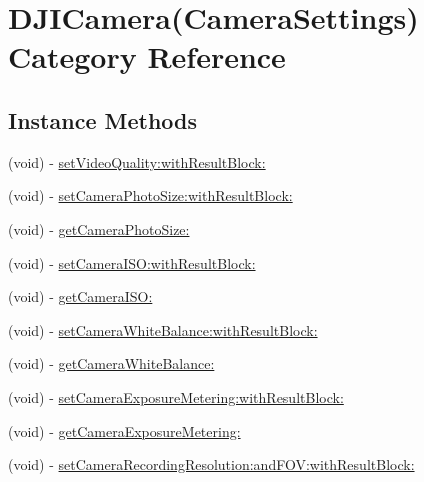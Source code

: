 \hypertarget{category_d_j_i_camera_07_camera_settings_08}{\section{D\+J\+I\+Camera(Camera\+Settings) Category Reference}
\label{category_d_j_i_camera_07_camera_settings_08}
}
\subsection*{Instance Methods}
\begin{DoxyCompactItemize}
\item 
(void) -\/ \hyperlink{category_d_j_i_camera_07_camera_settings_08_a056998f58df4c307417929683cd56066}{set\+Video\+Quality\+:with\+Result\+Block\+:}
\item 
(void) -\/ \hyperlink{category_d_j_i_camera_07_camera_settings_08_a0b0183eed1dbf991ce49942f32e78a4b}{set\+Camera\+Photo\+Size\+:with\+Result\+Block\+:}
\item 
(void) -\/ \hyperlink{category_d_j_i_camera_07_camera_settings_08_a3bb87caf5b5f9d3810cb4bad9cc15075}{get\+Camera\+Photo\+Size\+:}
\item 
(void) -\/ \hyperlink{category_d_j_i_camera_07_camera_settings_08_a50e4e75ec9ed1bdac6a058fc36820f77}{set\+Camera\+I\+S\+O\+:with\+Result\+Block\+:}
\item 
(void) -\/ \hyperlink{category_d_j_i_camera_07_camera_settings_08_a9b98d7b6e1f51e1087fed5e514bb9a3d}{get\+Camera\+I\+S\+O\+:}
\item 
(void) -\/ \hyperlink{category_d_j_i_camera_07_camera_settings_08_a196c669179c9c9cf02ef2b554f56081d}{set\+Camera\+White\+Balance\+:with\+Result\+Block\+:}
\item 
(void) -\/ \hyperlink{category_d_j_i_camera_07_camera_settings_08_a1b0a2c1fdbb4b01e1881b48f11355d86}{get\+Camera\+White\+Balance\+:}
\item 
(void) -\/ \hyperlink{category_d_j_i_camera_07_camera_settings_08_ada2dace1e4513d0fa39e99e9e80d32fc}{set\+Camera\+Exposure\+Metering\+:with\+Result\+Block\+:}
\item 
(void) -\/ \hyperlink{category_d_j_i_camera_07_camera_settings_08_a2bf7db98f17444eb1237a3e15876dbc9}{get\+Camera\+Exposure\+Metering\+:}
\item 
(void) -\/ \hyperlink{category_d_j_i_camera_07_camera_settings_08_ab31e7fceb02ab8297592c0237178c124}{set\+Camera\+Recording\+Resolution\+:and\+F\+O\+V\+:with\+Result\+Block\+:}

\end{DoxyCompactItemize}
